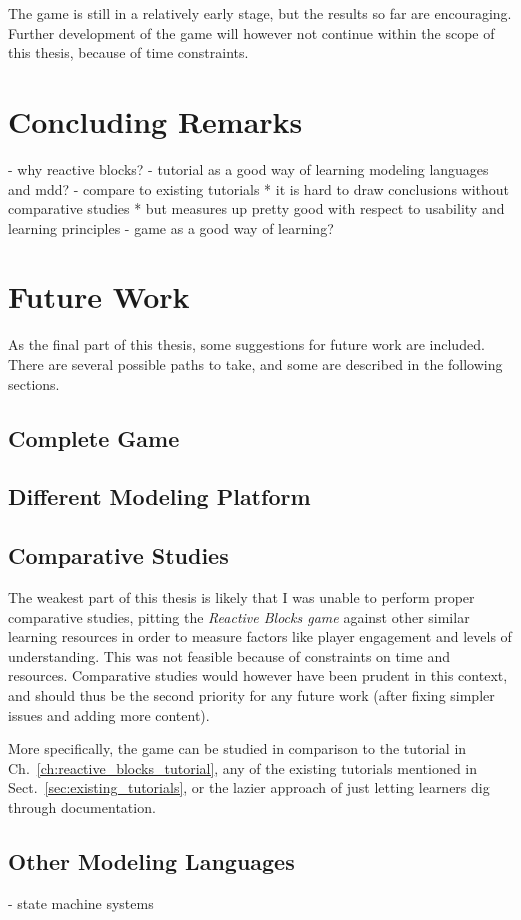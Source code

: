 \noindent
The game is still in a relatively early stage, but the results so far are encouraging. Further development of the game will however not continue within the scope of this thesis, because of time constraints.


\section{Concluding Remarks}
\label{sec:concluding_remarks}

- why reactive blocks?
- tutorial as a good way of learning modeling languages and mdd?
- compare to existing tutorials
	* it is hard to draw conclusions without comparative studies
	* but measures up pretty good with respect to usability and learning principles
- game as a good way of learning?





\section{Future Work}
\label{sec:future_work}
As the final part of this thesis, some suggestions for future work are included. There are several possible paths to take, and some are described in the following sections.

\subsection{Complete Game}


\subsection{Different Modeling Platform}


\subsection{Comparative Studies}
The weakest part of this thesis is likely that I was unable to perform proper comparative studies, pitting the \emph{Reactive Blocks game} against other similar learning resources in order to measure factors like player engagement and levels of understanding. This was not feasible because of constraints on time and resources. Comparative studies would however have been prudent in this context, and should thus be the second priority for any future work (after fixing simpler issues and adding more content).

\noindent
More specifically, the game can be studied in comparison to the tutorial in Ch.~\ref{ch:reactive_blocks_tutorial}, any of the existing tutorials mentioned in Sect.~\ref{sec:existing_tutorials}, or the lazier approach of just letting learners dig through documentation.


\subsection{Other Modeling Languages}
- state machine systems